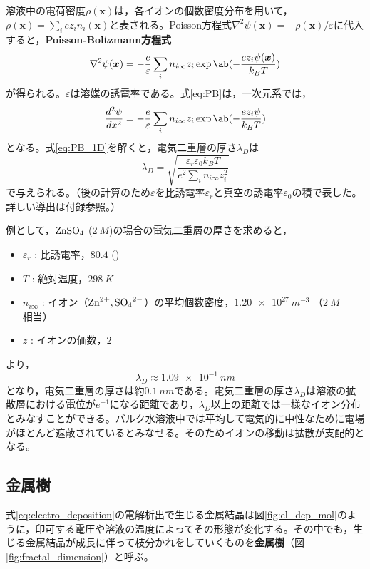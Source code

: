 \documentclass[autodetect-engine,dvi=dvipdfmx,a4paper,ja=standard,oneside,openany,11pt]{bxjsbook}
\begin{document}
溶液中の電荷密度$\rho(\bm{x})$は，各イオンの個数密度分布を用いて，$\rho(\bm{x})=\sum_{i}ez_in_i(\bm{x})$と表される。Poisson方程式$\nabla^2\psi(\bm{x})=-\rho(\bm{x})/\varepsilon$に代入すると，\textbf{Poisson-Boltzmann方程式}
\begin{equation}
  \nabla^2\psi(\bm{x}) = -\frac{e}{\varepsilon}\sum_{i}n_{i\infty}z_i\exp\ab(-\frac{ez_i\psi(\bm{x})}{k_BT})
  \label{eq:PB}
\end{equation}
が得られる。$\varepsilon$は溶媒の誘電率である。式\eqref{eq:PB}は，一次元系では，
\begin{equation}
  \frac{d^2\psi}{dx^2} = -\frac{e}{\varepsilon}\sum_{i}n_{i\infty}z_i\exp\ab(-\frac{ez_i\psi}{k_BT})
  \label{eq:PB_1D}
\end{equation}
となる。式\eqref{eq:PB_1D}を解くと，電気二重層の厚さ$\lambda_D$は
\begin{equation}
  \lambda_D = \sqrt{\frac{\varepsilon_r\varepsilon_0 k_BT}{e^2\sum_{i}n_{i\infty}z_i^2}}\label{eq:debye_length}
\end{equation}
で与えられる。（後の計算のため$\varepsilon$を比誘電率$\varepsilon_r$と真空の誘電率$\varepsilon_0$の積で表した。詳しい導出は付録参照。）

例として，$\ce{ZnSO_4}$ ($\SI{2}{M}$)の場合の電気二重層の厚さを求めると，
\begin{itemize}
  \item $\varepsilon_r$ : 比誘電率，$80.4$ ()
  \item $T$ : 絶対温度，$\SI{298}{K}$
  \item $n_{i\infty}$ : イオン（$\ce{Zn^{2+},SO_4^{2-}}$）の平均個数密度，$\SI{1.20e27}{m^{-3}}$ （$\SI{2}{M}$相当）
  \item $z$ : イオンの価数，$2$
\end{itemize}
より，
\begin{equation}
  \lambda_D\approx \SI{1.09e-1}{nm}
\end{equation}
となり，電気二重層の厚さは約$\SI{0.1}{nm}$である。電気二重層の厚さ$\lambda_D$は溶液の拡散層における電位が$e^{-1}$になる距離であり，$\lambda_D$以上の距離では一様なイオン分布とみなすことができる。バルク水溶液中では平均して電気的に中性なために電場がほとんど遮蔽されているとみなせる。そのためイオンの移動は拡散が支配的となる。
\subsection{金属樹}
式\eqref{eq:electro_deposition}の電解析出で生じる金属結晶は図\ref{fig:el_dep_mol}のように，印可する電圧や溶液の温度によってその形態が変化する\cite{suda2003temperature}。その中でも，生じる金属結晶が成長に伴って枝分かれをしていくものを\textbf{金属樹}（図\ref{fig:fractal_dimension}）と呼ぶ。
\end{document}
